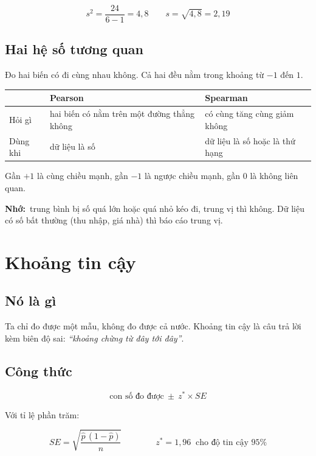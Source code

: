 \documentclass[12pt]{article}
\newcommand{\nho}{\textbf{Nhớ:}\ }
\begin{document}
\[
s^2 = \frac{24}{6-1} = 4{,}8
\qquad
s = \sqrt{4{,}8} = 2{,}19
\]

\subsection*{Hai hệ số tương quan}

Đo hai biến có đi cùng nhau không. Cả hai đều nằm trong khoảng từ $-1$ đến $1$.

\begin{center}
\begin{tabular}{@{}lll@{}}
\toprule
 & \textbf{Pearson} & \textbf{Spearman} \\
\midrule
Hỏi gì & hai biến có nằm trên một đường thẳng không & có cùng tăng cùng giảm không \\
Dùng khi & dữ liệu là số & dữ liệu là số hoặc là thứ hạng \\
\bottomrule
\end{tabular}
\end{center}

Gần $+1$ là cùng chiều mạnh, gần $-1$ là ngược chiều mạnh, gần $0$ là không liên quan.

\nho trung bình bị số quá lớn hoặc quá nhỏ kéo đi, trung vị thì không. Dữ liệu có
số bất thường (thu nhập, giá nhà) thì báo cáo trung vị.

\section{Khoảng tin cậy}

\subsection*{Nó là gì}

Ta chỉ đo được một mẫu, không đo được cả nước. Khoảng tin cậy là câu trả lời kèm
biên độ sai: \emph{``khoảng chừng từ đây tới đây''}.

\subsection*{Công thức}

\[
\text{con số đo được} \ \pm\ z^{*} \times SE
\]

Với tỉ lệ phần trăm:

\[
SE = \sqrt{\frac{\hat p\,(1-\hat p)}{n}}
\qquad\qquad
z^{*} = 1{,}96 \ \text{ cho độ tin cậy } 95\%
\]
\end{document}
